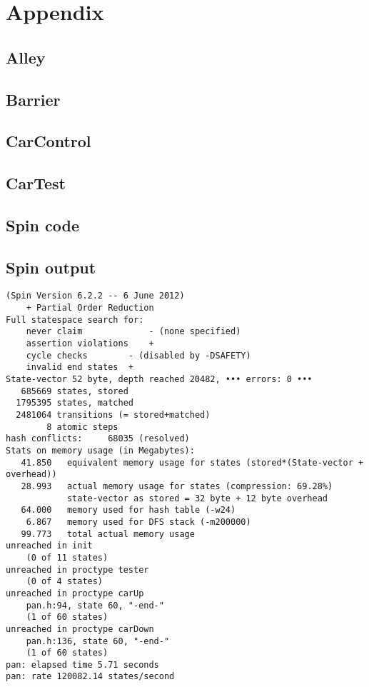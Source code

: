 \section{Appendix}

\subsection{Alley}


\newpage

\subsection{Barrier}


\newpage

\subsection{CarControl}


\newpage

\subsection{CarTest}


\newpage

\subsection{Spin code}


\newpage

\subsection{Spin output}
\label{app:spin_out}
\begin{verbatim}
(Spin Version 6.2.2 -- 6 June 2012)
	+ Partial Order Reduction
Full statespace search for:
	never claim         	- (none specified)
	assertion violations	+
	cycle checks       	- (disabled by -DSAFETY)
	invalid end states	+
State-vector 52 byte, depth reached 20482, ••• errors: 0 •••
   685669 states, stored
  1795395 states, matched
  2481064 transitions (= stored+matched)
        8 atomic steps
hash conflicts:     68035 (resolved)
Stats on memory usage (in Megabytes):
   41.850	equivalent memory usage for states (stored*(State-vector + overhead))
   28.993	actual memory usage for states (compression: 69.28%)
         	state-vector as stored = 32 byte + 12 byte overhead
   64.000	memory used for hash table (-w24)
    6.867	memory used for DFS stack (-m200000)
   99.773	total actual memory usage
unreached in init
	(0 of 11 states)
unreached in proctype tester
	(0 of 4 states)
unreached in proctype carUp
	pan.h:94, state 60, "-end-"
	(1 of 60 states)
unreached in proctype carDown
	pan.h:136, state 60, "-end-"
	(1 of 60 states)
pan: elapsed time 5.71 seconds
pan: rate 120082.14 states/second
\end{verbatim}

